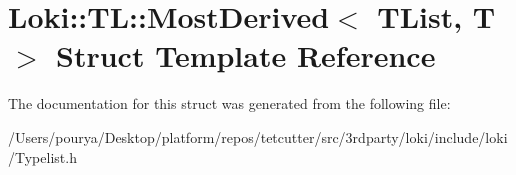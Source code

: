 \hypertarget{structLoki_1_1TL_1_1MostDerived}{}\section{Loki\+:\+:T\+L\+:\+:Most\+Derived$<$ T\+List, T $>$ Struct Template Reference}
\label{structLoki_1_1TL_1_1MostDerived}


The documentation for this struct was generated from the following file\+:\begin{DoxyCompactItemize}
\item 
/\+Users/pourya/\+Desktop/platform/repos/tetcutter/src/3rdparty/loki/include/loki/Typelist.\+h\end{DoxyCompactItemize}

